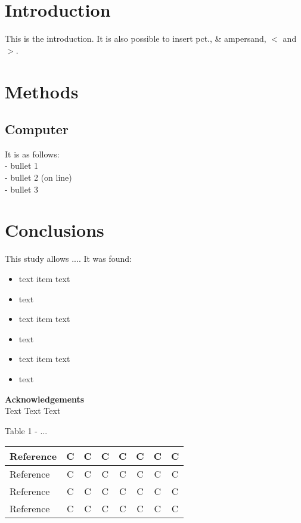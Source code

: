 \documentclass[11pt]{article}
\begin{document}
\section{Introduction}
This is the introduction.
  It is also possible to insert pct., \& ampersand, $<$ and $>$.

\section{Methods}
\subsection{Computer}
It is 
as follows: \\
- bullet 1\\
- bullet 2 (on line)\\
- bullet 3\\

\section{Conclusions }
This study allows ....
It was found:\\
\begin{itemize}
\item text item
text
\item text
\item text item
text
\item text
\item text item
text
\item text
\end{itemize}


\noindent
{\bf Acknowledgements}\\
Text 
Text 
Text 


 Table 1 - ... 

\begin{tabular}{ | l | c | c    | c   | c    |   c  |  c    |   c   | }
\hline
     Reference  & C & C   & C & C   &  C   &C   &  C  \\
\hline
     Reference  & C & C   & C & C   &  C   &C   &  C  \\
\hline
     Reference  & C & C   & C & C   &  C   &C   &  C  \\
\hline
     Reference  & C & C   & C & C   &  C   &C   &  C  \\
\hline
\end{tabular}
\end{document}
